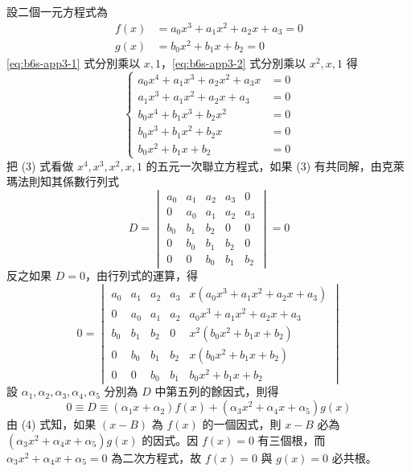 設二個一元方程式為
\begin{align}
f(x) &= a_0 x^3 + a_1 x^2 + a_2 x + a_3 = 0 \label{eq:b6s-app3-1} \\
g(x) &= b_0 x^2 + b_1 x + b_2 = 0 \label{eq:b6s-app3-2}
\end{align}
\eqref{eq:b6s-app3-1} 式分別乘以 $x, 1$，\eqref{eq:b6s-app3-2} 式分別乘以 $x^2, x, 1$ 得
\begin{equation}
\left\{\begin{aligned}
a_0 x^4 + a_1 x^3 + a_2 x^2 + a_3 x &= 0 \\
a_1 x^3 + a_1 x^2 + a_2 x + a_3 &= 0 \\
b_0 x^4 + b_1 x^3 + b_2 x^2 &= 0 \\
b_0 x^3 + b_1 x^2 + b_2 x &= 0 \\
b_0 x^2 + b_1 x + b_2 &= 0
\end{aligned}\right. \label{eq:b6s-app3-6}
\end{equation}
把 (3) 式看做 $x^4, x^3, x^2, x, 1$ 的五元一次聯立方程式，如果 (3) 有共同解，由克萊瑪法則知其係數行列式
\[ D = \begin{vmatrix}
a_0 & a_1 & a_2 & a_3 & 0 \\
0 & a_0 & a_1 & a_2 & a_3 \\
b_0 & b_1 & b_2 & 0 & 0 \\
0 & b_0 & b_1 & b_2 & 0 \\
0 & 0 & b_0 & b_1 & b_2
\end{vmatrix} = 0 \]
反之如果 $D=0$，由行列式的運算，得
\[ 0 = \begin{vmatrix}
a_0 & a_1 & a_2 & a_3 & x(a_0 x^3 + a_1 x^2 + a_2 x + a_3) \\
0 & a_0 & a_1 & a_2 & a_0 x^3 + a_1 x^2 + a_2 x + a_3 \\
b_0 & b_1 & b_2 & 0 & x^2(b_0 x^2 + b_1 x + b_2) \\
0 & b_0 & b_1 & b_2 & x(b_0 x^2 + b_1 x + b_2) \\
0 & 0 & b_0 & b_1 & b_0 x^2 + b_1 x + b_2
\end{vmatrix} \]
設 $\alpha_1, \alpha_2, \alpha_3, \alpha_4, \alpha_5$ 分別為 $D$ 中第五列的餘因式，則得
\begin{equation}
0 \equiv D \equiv (\alpha_1 x + \alpha_2) f(x) + (\alpha_3 x^2 + \alpha_4 x + \alpha_5) g(x) \label{eq:b6s-app3-4}
\end{equation}
由 (4) 式知，如果 $(x-B)$ 為 $f(x)$ 的一個因式，則 $x-B$ 必為 $(\alpha_3 x^2 + \alpha_4 x + \alpha_5) g(x)$ 的因式。因 $f(x)=0$ 有三個根，而 $\alpha_3 x^2 + \alpha_4 x + \alpha_5 = 0$ 為二次方程式，故 $f(x)=0$ 與 $g(x)=0$ 必共根。

